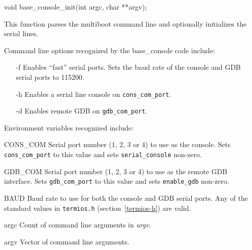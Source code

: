 \label{base-console-init}
\begin{apisyn}

	\funcproto void base_console_init(int argc, char **argv);
\end{apisyn}
\begin{apidesc}
	This function parses the multiboot command line and
	optionally initializes the serial lines.

	Command line options recognized by the base_console code include:
	\begin{itemize}
	\item[-f]
		Enables ``fast'' serial ports.
		Sets the baud rate of the console and GDB serial ports
		to 115200.
	\item[-h]
		Enables a serial line console on \texttt{cons_com_port}.
	\item[-d]
		Enables remote GDB on \texttt{gdb_com_port}.
	\end{itemize}

	Environment variables recognized include:
	\begin{csymlist}
	\item[CONS_COM]
		Serial port number (1, 2, 3 or 4) to use as the console.
		Sets \texttt{cons_com_port} to this value and sets
		\texttt{serial_console} non-zero.
	\item[GDB_COM]
		Serial port number (1, 2, 3 or 4) to use as the
		remote GDB interface.
		Sets \texttt{gdb_com_port} to this value and sets
		\texttt{enable_gdb} non-zero.
	\item[BAUD]
		Baud rate to use for both the console and GDB serial ports.
		Any of the standard values in \texttt{termios.h}
		(section~\ref{termios-h}) are valid.
	\end{csymlist}
\end{apidesc}
\begin{apiparm}
	\item[argc]
		Count of command line arguments in \emph{argv}.
	\item[argv]
		Vector of command line arguments.
\end{apiparm}
